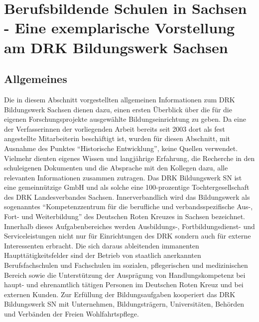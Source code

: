 \section[Vorstellung des DRK Bildungswerk Sachsen]{Berufsbildende Schulen in Sachsen - Eine exemplarische Vorstellung am DRK Bildungswerk Sachsen}
\label{sec:BerufsbildendeSchulenInSachsenEineExemplarischeVorstellungAmDRKBildungswerkSachsen}

\subsection{Allgemeines}
\label{sec:Allgemeines}

Die in diesem Abschnitt vorgestellten allgemeinen Informationen zum DRK Bildungswerk Sachsen dienen dazu, einen ersten Überblick über die für die eigenen Forschungsprojekte ausgewählte Bildungseinrichtung zu geben. Da eine der Verfasserinnen der vorliegenden Arbeit bereits seit 2003 dort als fest angestellte Mitarbeiterin beschäftigt ist, wurden für diesen Abschnitt, mit Ausnahme des Punktes "`Historische Entwicklung"', keine Quellen verwendet. Vielmehr dienten eigenes Wissen und langjährige Erfahrung, die Recherche in den schuleigenen Dokumenten und die Absprache mit den Kollegen dazu, alle relevanten Informationen zusammen zutragen.
Das DRK Bildungswerk SN ist eine gemeinnützige GmbH und als solche eine 100-prozentige Tochtergesellschaft des DRK Landesverbandes Sachsen. Innerverbandlich wird das Bildungswerk als sogenanntes "`Kompetenzzentrum für die berufliche und verbandsspezifische Aus-, Fort- und Weiterbildung"' des Deutschen Roten Kreuzes in Sachsen bezeichnet. Innerhalb dieses Aufgabenbereiches werden Ausbildungs-, Fortbildungsdienst- und Serviceleistungen nicht nur für Einrichtungen des DRK sondern auch für externe Interessenten erbracht. Die sich daraus ableitenden immanenten Haupttätigkeitsfelder sind der Betrieb von staatlich anerkannten Berufsfachschulen und Fachschulen im sozialen, pflegerischen und medizinischen Bereich sowie die Unterstützung der Ausprägung von Handlungskompetenz bei haupt- und ehrenamtlich tätigen Personen im Deutschen Roten Kreuz und bei externen Kunden. Zur Erfüllung der Bildungsaufgaben kooperiert das DRK Bildungswerk SN mit  Unternehmen, Bildungsträgern, Universitäten, Behörden und Verbänden der Freien Wohlfahrtspflege.

